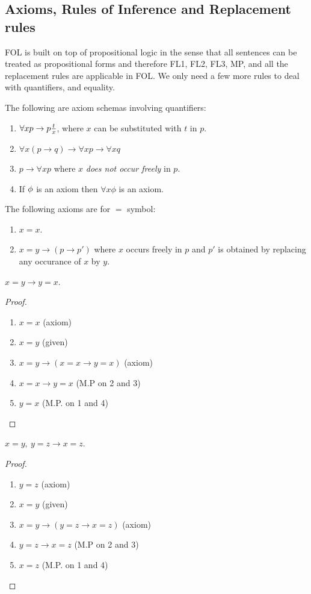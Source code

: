 \subsection{Axioms, Rules of Inference and Replacement rules}
FOL is built on top of propositional logic in the sense that all sentences can be treated as propositional forms and therefore FL1, FL2, FL3, MP, and all the replacement rules are applicable in FOL. We only need a few more rules to deal with quantifiers, and equality.
\begin{axiom}
  The following are axiom schemas involving quantifiers:
  \begin{enumerate}
    \item $\forall x p\to p\frac{t}{x}$, where $x$ can be substituted with $t$ in $p$.
    \item $\forall x (p \to q) \to \forall xp\to \forall xq$
    \item $p \to \forall x p$ where $x$ \textit{does not occur freely} in $p$.
    \item If $\phi$ is an axiom then $\forall x \phi$ is an axiom.
  \end{enumerate}
\end{axiom}
\begin{axiom}
  The following axioms are for $=$ symbol:
  \begin{enumerate}
    \item $x=x$.
    \item $x=y \to (p\to p')$ where $x$ occurs freely in $p$ and $p'$ is obtained by replacing any occurance of $x$ by $y$.
  \end{enumerate}
\end{axiom}
\begin{proposition}
  $x=y \to y =x$.
\end{proposition}
\begin{proof}
  \begin{enumerate}
    \item $x=x$ (axiom)
    \item $x=y$ (given)
    \item $x=y \to (x=x \to y=x)$ (axiom)
    \item $x=x \to y=x$ (M.P on 2 and 3)
    \item $y=x$ (M.P. on 1 and 4)
  \end{enumerate}
\end{proof}
\begin{proposition}
  $x=y,\ y =z \to x=z$.
\end{proposition}
\begin{proof}
  \begin{enumerate}
    \item $y=z$ (axiom)
    \item $x=y$ (given)
    \item $x=y \to (y=z \to x=z)$ (axiom)
    \item $y=z \to x=z$ (M.P on 2 and 3)
    \item $x=z$ (M.P. on 1 and 4)
  \end{enumerate}
\end{proof}
